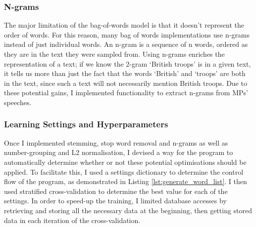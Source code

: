 \documentclass[12pt,a4paper,twoside,openright]{report}
\newcommand{\mylisting}[4]{}
\newcommand{\pylisting}[2]{\mylisting{Python}{py}{#1}{#2}}
\begin{document}
\subsubsection{N-grams}

The major limitation of the bag-of-words model is that it doesn't represent the order of words. For this reason, many bag of words implementations use n-grams instead of just individual words. An n-gram is a sequence of n words, ordered as they are in the text they were sampled from. Using n-grams enriches the representation of a text; if we know the 2-gram `British troops' is in a given text, it tells us more than just the fact that the words `British' and `troops' are both in the text, since such a text will not necessarily mention British troops. Due to these potential gains, I implemented functionality to extract n-grams from MPs' speeches.

\subsubsection{Learning Settings and Hyperparameters} \label{impl-learning}

Once I implemented stemming, stop word removal and n-grams as well as number-grouping and L2 normalisation, I devised a way for the program to automatically determine whether or not these potential optimisations should be applied. To facilitate this, I used a settings dictionary to determine the control flow of the program, as demonstrated in Listing \ref{lst:generate_word_list}. I then used stratified cross-validation to determine the best value for each of the settings. In order to speed-up the training, I limited database accesses by retrieving and storing all the necessary data at the beginning, then getting stored data in each iteration of the cross-validation.
\\\\
\pylisting{A function which uses given settings to produce a word list of a given text.}{generate_word_list}
\end{document}
